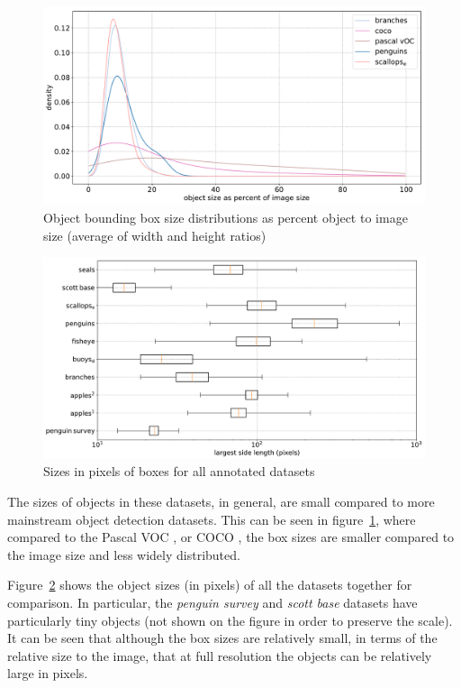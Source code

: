 \begin{figure}[ht]
\centering
\includegraphics[width=1.0\linewidth]{charts/summaries/sizes_density.pdf}
\caption{Object bounding box size distributions as percent object to image size (average of width and height ratios) }
\label{fig:box_sizes}
\end{figure}
 

\begin{figure}[ht]
\centering
\includegraphics[width=1.0\linewidth]{charts/summaries/sizes_boxplot.pdf}
\caption{ Sizes in pixels of boxes for all annotated datasets }
\label{fig:box_sizes_plot}
\end{figure}

The sizes of objects in these datasets, in general, are small compared to more mainstream object detection datasets. This can be seen in figure~\ref{fig:box_sizes}, where compared to the Pascal VOC \cite{Everingham2008}, or COCO \cite{Lin2014}, the box sizes are smaller compared to the image size and less widely distributed. 

Figure~\ref{fig:box_sizes_plot}  shows the object sizes (in pixels) of all the datasets together for comparison. In particular, the \emph{penguin survey} and \emph{scott base} datasets have particularly tiny objects (not shown on the figure in order to preserve the scale). It can be seen that although the box sizes are relatively small, in terms of the relative size to the image, that at full resolution the objects can be relatively large in pixels.


